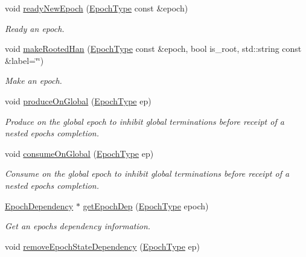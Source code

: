 \begin{DoxyCompactItemize}
void \hyperlink{structvt_1_1term_1_1_termination_detector_a93d5fd6eead47198c2ed4daaaf68c7ed}{ready\+New\+Epoch} (\hyperlink{namespacevt_a81d11b28122d43bf9834577e4a06440f}{Epoch\+Type} const \&epoch)
\begin{DoxyCompactList}\small\item\em Ready an epoch. \end{DoxyCompactList}\item 
void \hyperlink{structvt_1_1term_1_1_termination_detector_ab8ed0e9dd8e865c318c98013a99cd8a1}{make\+Rooted\+Han} (\hyperlink{namespacevt_a81d11b28122d43bf9834577e4a06440f}{Epoch\+Type} const \&epoch, bool is\+\_\+root, std\+::string const \&label=\char`\"{}\char`\"{})
\begin{DoxyCompactList}\small\item\em Make an epoch. \end{DoxyCompactList}\item 
void \hyperlink{structvt_1_1term_1_1_termination_detector_a34c4a04252832ddca7d6ffba7ffdda28}{produce\+On\+Global} (\hyperlink{namespacevt_a81d11b28122d43bf9834577e4a06440f}{Epoch\+Type} ep)
\begin{DoxyCompactList}\small\item\em Produce on the global epoch to inhibit global terminations before receipt of a nested epoch\textquotesingle{}s completion. \end{DoxyCompactList}\item 
void \hyperlink{structvt_1_1term_1_1_termination_detector_aea24708f1cc8a70f7843061871e7a5b3}{consume\+On\+Global} (\hyperlink{namespacevt_a81d11b28122d43bf9834577e4a06440f}{Epoch\+Type} ep)
\begin{DoxyCompactList}\small\item\em Consume on the global epoch to inhibit global terminations before receipt of a nested epoch\textquotesingle{}s completion. \end{DoxyCompactList}\item 
\hyperlink{structvt_1_1term_1_1_epoch_dependency}{Epoch\+Dependency} $\ast$ \hyperlink{structvt_1_1term_1_1_termination_detector_a34e823e14dcdd47e32c6eff45c3bf2de}{get\+Epoch\+Dep} (\hyperlink{namespacevt_a81d11b28122d43bf9834577e4a06440f}{Epoch\+Type} epoch)
\begin{DoxyCompactList}\small\item\em Get an epoch\textquotesingle{}s dependency information. \end{DoxyCompactList}\item 
void \hyperlink{structvt_1_1term_1_1_termination_detector_aac9b76ef4345ca2c757f829a17bb7bfb}{remove\+Epoch\+State\+Dependency} (\hyperlink{namespacevt_a81d11b28122d43bf9834577e4a06440f}{Epoch\+Type} ep)

\end{DoxyCompactItemize}
